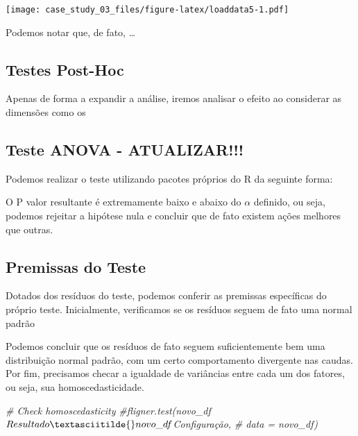 \documentclass[
]{article}
\newenvironment{Shaded}{\begin{snugshade}}{\end{snugshade}}
\newcommand{\CommentTok}[1]{\textcolor[rgb]{0.56,0.35,0.01}{\textit{#1}}}
\begin{document}
\texttt{[image: case\_study\_03\_files/figure-latex/loaddata5-1.pdf]}

Podemos notar que, de fato, \ldots{}

\hypertarget{testes-post-hoc}{%
\subsection{Testes Post-Hoc}\label{testes-post-hoc}}

Apenas de forma a expandir a análise, iremos analisar o efeito ao
considerar as dimensões como os

\hypertarget{teste-anova---atualizar}{%
\subsection{Teste ANOVA - ATUALIZAR!!!}\label{teste-anova---atualizar}}

Podemos realizar o teste utilizando pacotes próprios do R da seguinte
forma:

O P valor resultante é extremamente baixo e abaixo do \(\alpha\)
definido, ou seja, podemos rejeitar a hipótese nula e concluir que de
fato existem ações melhores que outras.

\hypertarget{premissas-do-teste}{%
\subsection{Premissas do Teste}\label{premissas-do-teste}}

Dotados dos resíduos do teste, podemos conferir as premissas específicas
do próprio teste. Inicialmente, verificamos se os resíduos seguem de
fato uma normal padrão

\begin{Shaded}
\end{Shaded}

Podemos concluir que os resíduos de fato seguem suficientemente bem uma
distribuição normal padrão, com um certo comportamento divergente nas
caudas. Por fim, precisamos checar a igualdade de variâncias entre cada
um dos fatores, ou seja, sua homoscedasticidade.

\begin{Shaded}
\begin{Highlighting}[]
\CommentTok{\# Check homoscedasticity}
\CommentTok{\#fligner.test(novo\_df$Resultado \textasciitilde{} novo\_df$Configuração, }
\CommentTok{\#             data = novo\_df)}
\end{Highlighting}
\end{Shaded}
\end{document}
